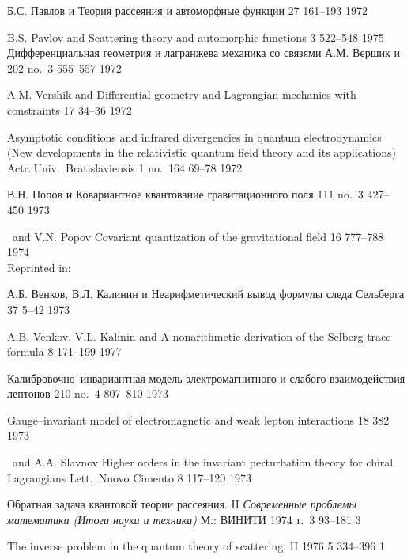 {Б.С. Павлов и \LD}
{Теория рассеяния и автоморфные функции}
{\Zap} {27} {} {161--193} {1972}

{B.S. Pavlov and \LF}
{Scattering theory and automorphic functions}
{\JSM} {3} {522--548} {1975} \\

{Дифференциальная геометрия и лагранжева механика со связями}
{А.М. Вершик и \LD}
{\DAN} {202} {no.~3} {555--557} {1972}

{A.M. Vershik and \LF}
{Differential geometry and Lagrangian mechanics with constraints}
{\SPD} {17} {34--36} {1972}

{\LF}
{Asymptotic conditions and infrared divergencies in
 quantum electrodynamics} {(New developments in the relativistic
quantum field theory and its applications)
Acta Univ.\ Bratislaviensis} {1} {no.~164} {69--78} {1972}

{В.Н. Попов и \LD}
{Ковариантное квантование гравитационного поля}
{\UFN} {111} {no.~3} {427--450} {1973}

{\LF\ and V.N. Popov}
{Covariant quantization of the gravitational field}
{\SPU} {16} {777--788} {1974} \\

Reprinted in: 

{А.Б. Венков, В.Л. Калинин и \LD}
{Неарифметический вывод формулы следа Сельберга}
{\Zap} {37} {} {5--42} {1973}

{A.B. Venkov, V.L. Kalinin and \LF}
{A nonarithmetic derivation of the Selberg trace formula}
{\JSM} {8} {171--199} {1977}

{\LD}
{Калибровочно--инвариантная модель электромагнитного и
 слабого взаимодействия лептонов}
{\DAN} {210} {no.~4} {807--810} {1973}

{\LF}
{Gauge--invariant model of electromagnetic and weak lepton interactions}
{\SPD} {18} {382} {1973}

{\LF\ and A.A. Slavnov}
{Higher orders in the invariant perturbation theory for chiral
 Lagrangians}
{Lett.\ Nuovo Cimento} {8} {} {117--120} {1973}

{\LD}
{Обратная задача квантовой теории рассеяния. II}
{\em Современные проблемы математики (Итоги науки и техники)}
{М.: ВИНИТИ} {} {1974} {т.~3} {93--181} {3}

{\LF} 
{The inverse problem in the quantum theory of scattering. II} 
{\JSM} {} {} {1976} {5} {334--396} {1}

